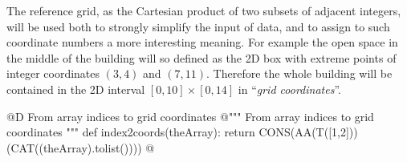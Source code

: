 \documentclass[11pt,oneside]{article}    %
\begin{document}
The reference grid, as the Cartesian product of two subsets of adjacent integers, will be used both to strongly simplify the input of data, and to assign to such coordinate numbers a more interesting meaning. For example the open space in the middle of the building will so defined as the 2D box with extreme points of integer coordinates $(3,4)$ and $(7,11)$.
Therefore the whole building  will be contained in the 2D interval $[0,10]\times [0,14]$ in ``\emph{grid coordinates}''.

@D From array indices to grid coordinates
@{""" From array indices to grid coordinates """
def index2coords(theArray):
    return CONS(AA(T([1,2]))(CAT((theArray).tolist())))
@}





\end{document}
